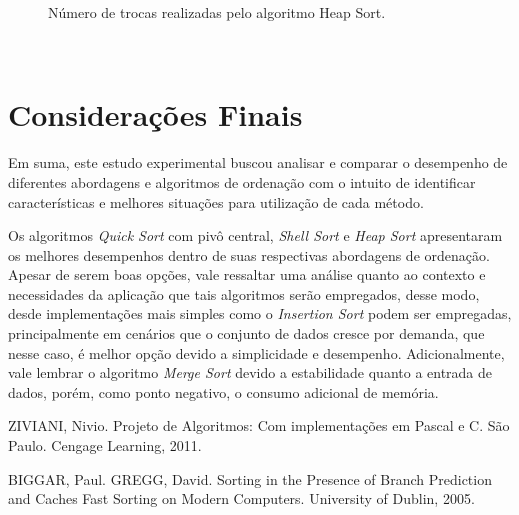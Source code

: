 \documentclass[conference,onecolumn]{IEEEtran}
\begin{document}
\begin{figure}[H]
\begin{center}
\end{center}
\caption{Número de trocas realizadas pelo algoritmo Heap Sort.}
\label{graf:heap-troca}
\end{figure}

~\\

\section{Considerações Finais}

Em suma, este estudo experimental buscou analisar e comparar o desempenho de diferentes abordagens e algoritmos de ordenação com o intuito de identificar características e melhores situações para utilização de cada método.

Os algoritmos \textit{Quick Sort} com pivô central, \textit{Shell Sort} e \textit{Heap Sort} apresentaram os melhores desempenhos dentro de suas respectivas abordagens de ordenação. Apesar de serem boas opções, vale ressaltar uma análise quanto ao contexto e necessidades da aplicação que tais algoritmos serão empregados, desse modo, desde implementações mais simples como o \textit{Insertion Sort} podem ser empregadas, principalmente em cenários que o conjunto de dados cresce por demanda, que nesse caso, é melhor opção devido a simplicidade e desempenho. Adicionalmente, vale lembrar o algoritmo \textit{Merge Sort} devido a estabilidade quanto a entrada de dados, porém, como ponto negativo, o consumo adicional de memória.

\begin{thebibliography}{9}

ZIVIANI, Nivio. Projeto de Algoritmos: Com implementações em Pascal e C. São Paulo. Cengage Learning, 2011.

BIGGAR, Paul. GREGG, David. Sorting in the Presence of Branch Prediction
and Caches Fast Sorting on Modern Computers. University of Dublin, 2005.

\end{thebibliography}

\end{document}
